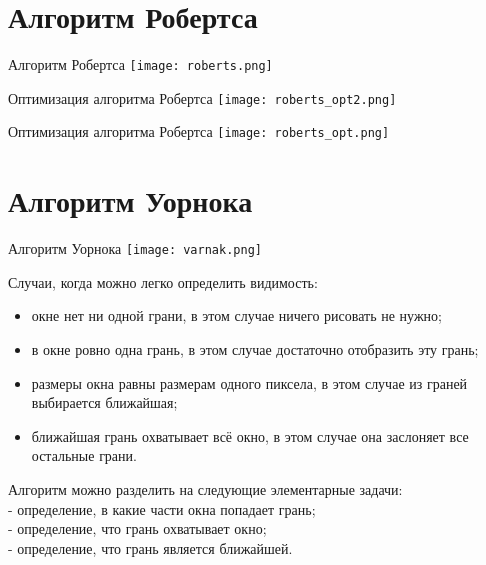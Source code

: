 \documentclass[10pt]{beamer}
\begin{document}
	\section{Алгоритм Робертса}
	
	\begin{frame}{Алгоритм Робертса}
		\centering%
		\texttt{[image: roberts.png]}
	\end{frame}
	
		\begin{frame}{Оптимизация алгоритма Робертса}
		\centering%
		\texttt{[image: roberts\_opt2.png]}
	\end{frame}
	
		\begin{frame}{Оптимизация алгоритма Робертса}
		\centering%
		\texttt{[image: roberts\_opt.png]}
	\end{frame}
	
	
	\section{Алгоритм Уорнока}
	
	\begin{frame}{Алгоритм Уорнока}
		{
			\centering%
			\texttt{[image: varnak.png]}	
		}
		{
			Случаи, когда можно легко определить видимость:
			\begin{itemize}				
			
			\item окне нет ни одной грани, в этом случае ничего рисовать не нужно;
			\item в окне ровно одна грань, в этом случае достаточно отобразить эту
			грань;
			\item размеры окна равны размерам одного пиксела, в этом случае из
			граней выбирается ближайшая;
			\item ближайшая грань охватывает всё окно, в этом случае она заслоняет все остальные грани.
			
			\end{itemize}
		}
		
		Алгоритм можно разделить на следующие элементарные задачи:\\
		- определение, в какие части окна попадает грань;\\
		- определение, что грань охватывает окно;\\
		- определение, что грань является ближайшей.
	\end{frame}
	
\end{document}
